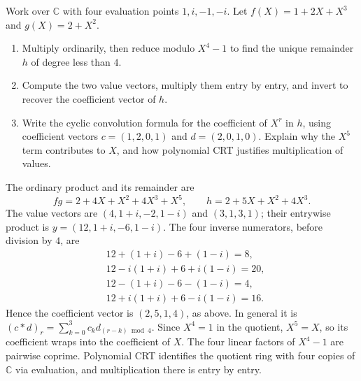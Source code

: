 Work over $\mathbb C$ with four evaluation points $1,i,-1,-i$.
Let $f(X)=1+2X+X^3$ and $g(X)=2+X^2$.
\begin{enumerate}
 \item Multiply ordinarily, then reduce modulo $X^4-1$ to find the
 unique remainder $h$ of degree less than $4$. 
 \item Compute the two value vectors, multiply them entry by entry,
 and invert to recover the coefficient vector of $h$. 
 \item Write the cyclic convolution formula for the coefficient of
 $X^r$ in $h$, using coefficient vectors $c=(1,2,0,1)$ and
 $d=(2,0,1,0)$. Explain why the $X^5$ term contributes to $X$,
 and how polynomial CRT justifies multiplication of values. 
\end{enumerate}
\begin{solution}
The ordinary product and its remainder are
\[
 fg=2+4X+X^2+4X^3+X^5,\qquad h=2+5X+X^2+4X^3.
\]
The value vectors are $(4,1+i,-2,1-i)$ and $(3,1,3,1)$;
their entrywise product is $y=(12,1+i,-6,1-i)$.
The four inverse numerators, before division by $4$, are
\[
\begin{aligned}
 &12+(1+i)-6+(1-i)=8,\\
 &12-i(1+i)+6+i(1-i)=20,\\
 &12-(1+i)-6-(1-i)=4,\\
 &12+i(1+i)+6-i(1-i)=16.
\end{aligned}
\]
Hence the coefficient vector is $(2,5,1,4)$, as above.
In general it is $(c*d)_r=\sum_{k=0}^3 c_kd_{(r-k)\bmod4}$.
Since $X^4=1$ in the quotient, $X^5=X$, so its coefficient wraps into
the coefficient of $X$. The four linear factors of $X^4-1$ are pairwise
coprime. Polynomial CRT identifies the quotient ring with four copies of
$\mathbb C$ via evaluation, and multiplication there is entry by entry.
\end{solution}

